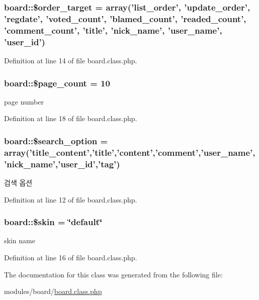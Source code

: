 \hypertarget{classboard_a66d1965fe6a51e8143499adeaf3998cc}{
\subsubsection[{\$order\+\_\+target}]{\setlength{\rightskip}{0pt plus 5cm}board\+::\$order\+\_\+target = array('list\+\_\+order', 'update\+\_\+order', 'regdate', 'voted\+\_\+count', 'blamed\+\_\+count', 'readed\+\_\+count', 'comment\+\_\+count', '{\bf title}', '{\bf nick\+\_\+name}', '{\bf user\+\_\+name}', '{\bf user\+\_\+id}')}}\label{classboard_a66d1965fe6a51e8143499adeaf3998cc}


Definition at line 14 of file board.\+class.\+php.

\hypertarget{classboard_ab5d2d3925f753039483da2c65076122b}{
\subsubsection[{\$page\+\_\+count}]{\setlength{\rightskip}{0pt plus 5cm}board\+::\$page\+\_\+count = 10}}\label{classboard_ab5d2d3925f753039483da2c65076122b}


page number 



Definition at line 18 of file board.\+class.\+php.

\hypertarget{classboard_a6affe0c86966ebd06572cc4c8abde32b}{
\subsubsection[{\$search\+\_\+option}]{\setlength{\rightskip}{0pt plus 5cm}board\+::\$search\+\_\+option = array('title\+\_\+content','{\bf title}','{\bf content}','{\bf comment}','{\bf user\+\_\+name}','{\bf nick\+\_\+name}','{\bf user\+\_\+id}','{\bf tag}')}}\label{classboard_a6affe0c86966ebd06572cc4c8abde32b}


검색 옵션 



Definition at line 12 of file board.\+class.\+php.

\hypertarget{classboard_ac7e864ad1db563c4d3f97291dd90291f}{
\subsubsection[{\$skin}]{\setlength{\rightskip}{0pt plus 5cm}board\+::\$skin = \char`\"{}default\char`\"{}}}\label{classboard_ac7e864ad1db563c4d3f97291dd90291f}


skin name 



Definition at line 16 of file board.\+class.\+php.



The documentation for this class was generated from the following file\+:\begin{DoxyCompactItemize}
\item 
modules/board/\hyperlink{board_8class_8php}{board.\+class.\+php}\end{DoxyCompactItemize}
